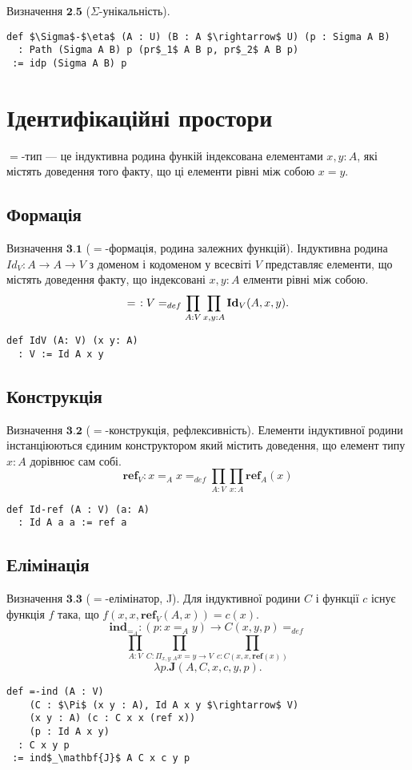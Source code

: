 \documentclass{article}
\theoremstyle{definition}
\begin{document}
$\textbf{Визначення\ 2.5}$ ($\Sigma$-унікальність).
\begin{lstlisting}[mathescape=true]
def $\Sigma$-$\eta$ (A : U) (B : A $\rightarrow$ U) (p : Sigma A B)
  : Path (Sigma A B) p (pr$_1$ A B p, pr$_2$ A B p)
 := idp (Sigma A B) p
\end{lstlisting}

\newpage
\section{Ідентифікаційні простори}

$=$-тип --- це індуктивна родина функій індексована елементами $x,y : A$,
які містять доведення того факту, що ці елементи рівні між собою $x=y$.

\subsection{Формація}
$\textbf{Визначення\ 3.1}$ ($=$-формація, родина залежних функцій). Індуктивна родина
$Id_V: A \rightarrow A \rightarrow V$ з доменом і кодоменом у всесвіті $V$
представляє елементи, що містять доведення факту, що індексовані $x,y:A$
елменти рівні між собою.
$$
  =\hspace{0.4em} : V =_{def} \prod_{A:V}\prod_{x,y:A} \mathbf{Id}_V(A,x,y).
$$
\begin{lstlisting}[mathescape=true]
def IdV (A: V) (x y: A)
  : V := Id A x y
\end{lstlisting}

\subsection{Конструкція}
$\textbf{Визначення\ 3.2}$ ($=$-конструкція, рефлексивність). Елементи індуктивної родини
інстанціюються єдиним конструктором який містить доведення, що елемент типу $x:A$ дорівнює сам собі.
$$
   \mathbf{ref}_V : x =_A x =_{def} \prod_{A:V}\prod_{x:A} \mathbf{ref}_A(x)
$$
\begin{lstlisting}[mathescape=true]
def Id-ref (A : V) (a: A)
  : Id A a a := ref a
\end{lstlisting}

\subsection{Елімінація}
$\textbf{Визначення\ 3.3}$ ($=$-елімінатор, J). Для індуктивної родини
$C$ і функції $c$ існує функція $f$ така, що $f(x,x,\mathbf{ref}_V(A,x)) = c(x)$.
$$
    \mathbf{ind}_{=_A} : (p: x =_A y) \rightarrow C(x,y,p) =_{def}
$$
$$
    \prod_{A:V}\prod_{C:\Pi_{x,y:A}x=y\rightarrow V}\prod_{c: C(x,x,\mathbf{ref}(x))}
$$
$$
    \lambda p.\mathbf{J}(A,C,x,c,y,p).
$$
\begin{lstlisting}[mathescape=true]
def =-ind (A : V)
    (C : $\Pi$ (x y : A), Id A x y $\rightarrow$ V)
    (x y : A) (c : C x x (ref x))
    (p : Id A x y)
  : C x y p
 := ind$_\mathbf{J}$ A C x c y p
\end{lstlisting}
\end{document}
